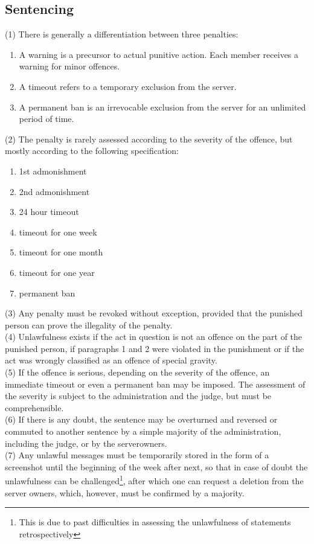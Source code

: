 \documentclass{article}
\begin{document}
\subsection{Sentencing}
(1) There is generally a differentiation between three penalties:
\begin{enumerate}
	\item A warning is a precursor to actual punitive action. Each member receives a warning for minor offences.
	\item A timeout refers to a temporary exclusion from the server.
	\item A permanent ban is an irrevocable exclusion from the server for an unlimited period of time.
\end{enumerate}
(2) The penalty is rarely assessed according to the severity of the offence, but mostly according to the following specification:
\begin{enumerate}
	\item 1st admonishment
	\item 2nd admonishment
	\item 24 hour timeout
	\item timeout for one week
	\item timeout for one month
	\item timeout for one year
	\item permanent ban
\end{enumerate}
(3) Any penalty must be revoked without exception, provided that the punished person can prove the illegality of the penalty.\\
(4) Unlawfulness exists if the act in question is not an offence on the part of the punished person, if paragraphs 1 and 2 were violated in the punishment or if the act was wrongly classified as an offence of special gravity.\\
(5) If the offence is serious, depending on the severity of the offence, an immediate timeout or even a permanent ban may be imposed. The assessment of the severity is subject to the administration and the judge, but must be comprehensible. \\
(6) If there is any doubt, the sentence may be overturned and reversed or commuted to another sentence by a simple majority of the administration, including the judge, or by the serverowners.\\
(7) Any unlawful messages must be temporarily stored in the form of a screenshot until the beginning of the week after next, so that in case of doubt the unlawfulness can be challenged\footnote{This is due to past difficulties in assessing the unlawfulness of statements retrospectively}, after which one can request a deletion from the server owners, which, however, must be confirmed by a majority.\\
\end{document}
